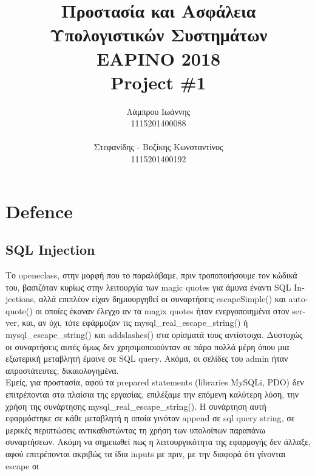 \documentclass{article}
\begin{document}
\title{\vspace{-3.5cm}\textbf{Προστασία και Ασφάλεια Υπολογιστικών Συστημάτων \\ΕΑΡΙΝΟ 2018\\ \textlatin{Project \#}1}}
\author{Λάμπρου Ιωάννης \\1115201400088\\\\ Στεφανίδης - Βοζίκης Κωνσταντίνος \\1115201400192}

\maketitle
\section*{\textlatin{Defence}}
\subsection*{\textlatin{SQL Injection}}
Το \textlatin{openeclass}, στην μορφή που το παραλάβαμε, πριν τροποποιήσουμε τον κώδικά του, βασιζόταν κυρίως στην λειτουργία των \textlatin{magic quotes} για άμυνα έναντι \textlatin{SQL Injections}, αλλά επιπλέον είχαν δημιουργηθεί οι συναρτήσεις \textlatin{escapeSimple()} και \textlatin{autoquote()} οι οποίες έκαναν έλεγχο αν τα \textlatin{magix quotes} ήταν ενεργοποιημένα στον \textlatin{server}, και, αν όχι, τότε εφάρμοζαν τις \textlatin{mysql\_real\_escape\_string()} ή \textlatin{mysql\_escape\_string()} και \textlatin{addslashes()} στα ορίσματά τους αντίστοιχα. Δυστυχώς οι συναρτήσεις αυτές όμως δεν χρησιμοποιούνταν σε πάρα πολλά μέρη όπου μια εξωτερική μεταβλητή έμαινε σε \textlatin{SQL query}. Ακόμα, οι σελίδες του \textlatin{admin} ήταν απροστάτευτες, δικαιολογημένα.\\
Εμείς, για προστασία, αφού τα \textlatin{prepared statements (libraries MySQLi, PDO)} δεν επιτρέπονται στα πλαίσια της εργασίας, επιλέξαμε την επόμενη καλύτερη λύση, την χρήση της συνάρτησης \textlatin{mysql\_real\_escape\_string()}. Η συνάρτηση αυτή εφαρμόστηκε σε κάθε μεταβλητή η οποία γινόταν \textlatin{append} σε \textlatin{sql query string}, σε μερικές περιπτώσεις αντικαθιστώντας τη χρήση των υπολοίπων παραπάνω συναρτήσεων. Ακόμη να σημειωθεί πως η λειτουργικότητα της εφαρμογής δεν άλλαξε, αφού επιτρέπονται ακριβώς τα ίδια \textlatin{inputs} με   
πριν, με την διαφορά ότι γίνονται \textlatin{escape} οι 
\end{document}
